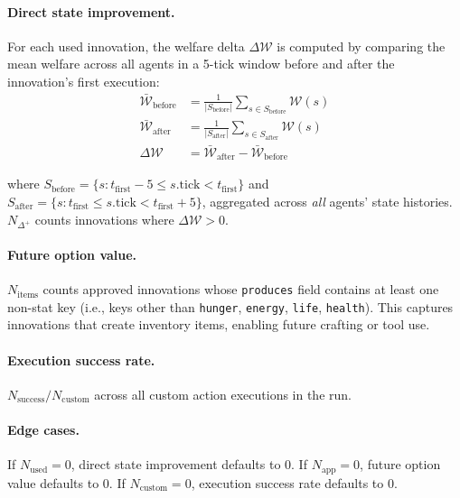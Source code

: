 \documentclass[a4paper, 11pt]{article}
\newcommand{\Napp}{N_{\text{app}}}
\newcommand{\Nused}{N_{\text{used}}}
\newcommand{\Ncustom}{N_{\text{custom}}}
\newcommand{\Nsuccess}{N_{\text{success}}}
\newcommand{\welfare}{\mathcal{W}}
\begin{document}
\paragraph{Direct state improvement.} For each used innovation, the welfare delta $\Delta\welfare$ is computed by comparing the mean welfare across all agents in a 5-tick window before and after the innovation's first execution:
\begin{align}
    \bar{\welfare}_{\text{before}} &= \frac{1}{|S_{\text{before}}|} \sum_{s \in S_{\text{before}}} \welfare(s) \label{eq:welfare_before} \\
    \bar{\welfare}_{\text{after}}  &= \frac{1}{|S_{\text{after}}|}  \sum_{s \in S_{\text{after}}}  \welfare(s) \label{eq:welfare_after} \\
    \Delta\welfare &= \bar{\welfare}_{\text{after}} - \bar{\welfare}_{\text{before}}
\end{align}

\noindent where $S_{\text{before}} = \{s : t_{\text{first}} - 5 \leq s.\text{tick} < t_{\text{first}}\}$ and $S_{\text{after}} = \{s : t_{\text{first}} \leq s.\text{tick} < t_{\text{first}} + 5\}$, aggregated across \emph{all} agents' state histories. $N_{\Delta^+}$ counts innovations where $\Delta\welfare > 0$.

\paragraph{Future option value.} $N_{\text{items}}$ counts approved innovations whose \texttt{produces} field contains at least one non-stat key (i.e., keys other than \texttt{hunger}, \texttt{energy}, \texttt{life}, \texttt{health}). This captures innovations that create inventory items, enabling future crafting or tool use.

\paragraph{Execution success rate.} $\Nsuccess / \Ncustom$ across all custom action executions in the run.

\paragraph{Edge cases.} If $\Nused = 0$, direct state improvement defaults to $0$. If $\Napp = 0$, future option value defaults to $0$. If $\Ncustom = 0$, execution success rate defaults to $0$.

\end{document}
